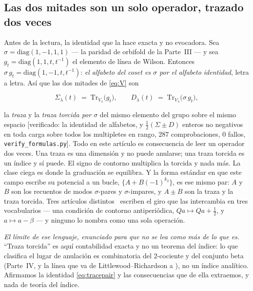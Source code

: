 \documentclass[11pt,a4paper]{article}
\newcommand{\Sig}{\Sigma_\lambda}
\newcommand{\Dl}{D_\lambda}
\newenvironment{keyeq}
  {\begin{center}\setlength{\fboxsep}{9pt}\setlength{\fboxrule}{0.8pt}%
   \begin{lrbox}{\keyeqbox}\begin{minipage}{0.88\textwidth}}
  {\end{minipage}\end{lrbox}%
   \fcolorbox{hdrblue!55}{hdrblue!6}{\usebox{\keyeqbox}}\end{center}}
\begin{document}
\subsection*{Las dos mitades son un solo operador, trazado dos veces}

Antes de la lectura, la identidad que la hace exacta y no evocadora. Sea
$\sigma=\mathrm{diag}(1,-1,1,1)$ --- la paridad de orbifold de la Parte~III --- y sea
$g_t=\mathrm{diag}(1,1,t,t^{-1})$ el elemento de línea de Wilson. Entonces
$\sigma\,g_t=\mathrm{diag}(1,-1,t,t^{-1})$: \emph{el alfabeto del coset es $\sigma$ por el alfabeto
identidad}, letra a letra. Así que las dos mitades de \eqref{eq:V} son

\begin{keyeq}
\begin{equation}\label{eq:tracepair}
\Sig(t)\;=\;\mathrm{Tr}_{V_\lambda}\big(g_t\big),
\qquad
\Dl(t)\;=\;\mathrm{Tr}_{V_\lambda}\big(\sigma\,g_t\big),
\end{equation}
\end{keyeq}

\noindent la \emph{traza} y la \emph{traza torcida por $\sigma$} del mismo elemento del grupo sobre
el mismo espacio [verificado: la identidad de alfabetos, y $\tfrac12(\Sigma\pm D)$ enteros no
negativos en toda carga sobre todos los multipletes en rango, $287$ comprobaciones, $0$ fallos,
\texttt{verify\_formulas.py}]. Todo en este artículo es consecuencia de leer un operador dos veces.
Una traza es una dimensión y no puede anularse; una traza torcida es un índice y sí puede. El signo
de contorno multiplica la torcida y nada más. La clase ciega es donde la graduación se equilibra. Y
la forma estándar en que este campo escribe su potencial a un bucle, $\{A+B(-1)^{k_2}\}$, es ese
mismo par: $A$ y $B$ son los recuentos de modos $\sigma$-pares y $\sigma$-impares, y $A\pm B$ son la
traza y la traza torcida. Tres artículos distintos~\cite{AHMN,HY,HHHK} escriben el giro que las
intercambia en tres vocabularios --- una condición de contorno antiperiódica,
$Qa\mapsto Qa+\tfrac12$, y $a\mapsto a-\beta$ --- y ninguno lo nombra como una sola operación.

\emph{El límite de ese lenguaje, enunciado para que no se lea como más de lo que es.} ``Traza
torcida'' es aquí contabilidad exacta y no un teorema del índice: lo que clasifica el lugar de
anulación es combinatoria del $2$-cociente y del conjunto beta (Parte~IV, y la línea que va de
Littlewood--Richardson a \cite{Lecouvey,AK,Albion}), no un índice analítico. Afirmamos la identidad
\eqref{eq:tracepair} y las consecuencias que de ella extraemos, y nada de teoría del índice.
\end{document}

